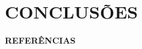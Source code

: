 \vspace{0.5cm}
\chapter{CONCLUSÕES}\label{chapter:conclusoes}



\vspace{0.5cm}
\noindent\hypertarget{referencias}{\textbf{REFERÊNCIAS}}
\vspace{0.5cm}
\renewcommand{\refname}{ }
\renewcommand{\bibname}{ }
\vspace{-11mm}


